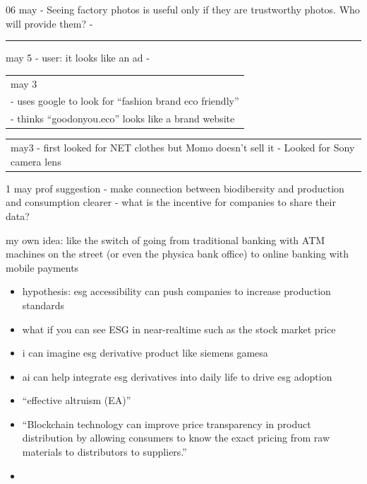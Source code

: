 \documentclass[
  letterpaper,
  DIV=11,
  numbers=noendperiod]{scrartcl}
\begin{document}
06 may - Seeing factory photos is useful only if they are trustworthy
photos. Who will provide them? -

\begin{center}\rule{0.5\linewidth}{0.5pt}\end{center}

may 5 - user: it looks like an ad -

\begin{longtable}[]{@{}l@{}}
\toprule\noalign{}
\endhead
\bottomrule\noalign{}
\endlastfoot
may 3 \\
- uses google to look for ``fashion brand eco friendly'' \\
- thinks ``goodonyou.eco'' looks like a brand website \\
\end{longtable}

\begin{longtable}[]{@{}
  >{\raggedright\arraybackslash}p{}@{}}
\toprule\noalign{}
\endhead
\bottomrule\noalign{}
\endlastfoot
may3 - first looked for NET clothes but Momo doesn't sell it - Looked
for Sony camera lens \\
\end{longtable}

1 may prof suggestion - make connection between biodibersity and
production and consumption clearer - what is the incentive for companies
to share their data?

my own idea: like the switch of going from traditional banking with ATM
machines on the street (or even the physica bank office) to online
banking with mobile payments

\begin{itemize}
\item
  hypothesis: esg accessibility can push companies to increase
  production standards
\item
  what if you can see ESG in near-realtime such as the stock market
  price
\item
  i can imagine esg derivative product like siemens gamesa
\item
  ai can help integrate esg derivatives into daily life to drive esg
  adoption
\item
  ``effective altruism (EA)''
\item
  ``Blockchain technology can improve price transparency in product
  distribution by allowing consumers to know the exact pricing from raw
  materials to distributors to suppliers.''
\item
\end{itemize}
\end{document}
